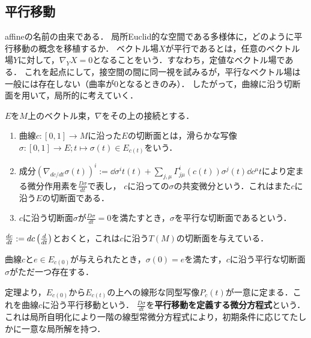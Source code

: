 \documentclass[uplatex,dvipdfmx]{jsreport}
\begin{document}
\subsection{平行移動}

\begin{tcolorbox}[colframe=ForestGreen, colback=ForestGreen!10!white,breakable,colbacktitle=ForestGreen!40!white,coltitle=black,fonttitle=\bfseries\sffamily,
title=]
    affineの名前の由来である．
    局所Euclid的な空間である多様体に，どのように平行移動の概念を移植するか．
    ベクトル場$X$が平行であるとは，任意のベクトル場$Y$に対して，$\nabla_YX=0$となることをいう．すなわち，定値なベクトル場である．
    これを起点にして，接空間の間に同一視を試みるが，平行なベクトル場は一般には存在しない（曲率が$0$となるときのみ）．
    したがって，曲線に沿う切断面を用いて，局所的に考えていく．
\end{tcolorbox}

\begin{definition}
    $E$を$M$上のベクトル束，$\nabla$をその上の接続とする．
    \begin{enumerate}
        \item 曲線$c:[0,1]\to M$に沿った$E$の切断面とは，滑らかな写像$\sigma:[0,1]\to E;t\mapsto \sigma(t)\in E_{c(t)}$をいう．
        \item 成分$(\nabla_{dc/dt}\sigma(t))^i:=\dd{\sigma^i}{t}(t)+\sum_{j,\mu}\Gamma^i_{j\mu}(c(t))\sigma^j(t)\dd{c^\mu}{t}$により定まる微分作用素を$\frac{D\sigma}{dt}$で表し，
        $c$に沿っての$\sigma$の共変微分という．これはまた$c$に沿う$E$の切断面である．
        \item $c$に沿う切断面$\sigma$が$\frac{D\sigma}{dt}=0$を満たすとき，$\sigma$を平行な切断面であるという．
    \end{enumerate}
\end{definition}
\begin{example}
    $\frac{d c}{d t}:=dc\left(\frac{d }{d t}\right)$とおくと，これは$c$に沿う$T(M)$の切断面を与えている．
\end{example}

\begin{theorem}
    曲線$c$と$e\in E_{c(0)}$が与えられたとき，$\sigma(0)=e$を満たす，$c$に沿う平行な切断面$\sigma$がただ一つ存在する．
\end{theorem}

\begin{definition}
    定理より，$E_{c(0)}$から$E_{c(t)}$の上への線形な同型写像$P_c(t)$が一意に定まる．これを曲線$c$に沿う平行移動という．
    $\frac{D\sigma}{dt}$を\textbf{平行移動を定義する微分方程式}という．
    これは局所自明化により一階の線型常微分方程式により，初期条件に応じてたしかに一意な局所解を持つ．
\end{definition}
\end{document}
